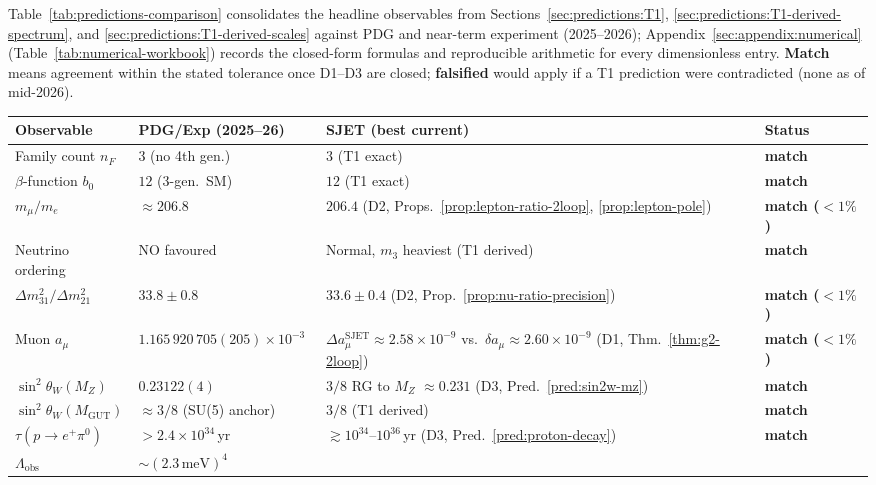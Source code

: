 Table~\ref{tab:predictions-comparison} consolidates the headline observables
from Sections~\ref{sec:predictions:T1},
\ref{sec:predictions:T1-derived-spectrum}, and
\ref{sec:predictions:T1-derived-scales} against PDG and near-term experiment
(2025--2026); Appendix~\ref{sec:appendix:numerical}
(Table~\ref{tab:numerical-workbook}) records the closed-form formulas and
reproducible arithmetic for every dimensionless entry. \textbf{Match} means
agreement within the stated tolerance once D1--D3 are closed; \textbf{falsified}
would apply if a T1 prediction were contradicted (none as of mid-2026).

\begin{table}[ht]
\centering
\small
\renewcommand{\arraystretch}{1.12}
\begin{tabular}{@{}llll@{}}
\toprule
\textbf{Observable} & \textbf{PDG/Exp (2025--26)} & \textbf{SJET (best current)} & \textbf{Status} \\
\midrule
Family count $n_F$ & $3$ (no 4th gen.) & $3$ (T1 exact) & \textbf{match} \\
$\beta$-function $b_0$ & $12$ (3-gen.\ SM) & $12$ (T1 exact) & \textbf{match} \\
$m_\mu/m_e$ & $\approx 206.8$~\cite{PDG2025}
  & $206.4$ (D2, Props.~\ref{prop:lepton-ratio-2loop},
  \ref{prop:lepton-pole}) & \textbf{match ($<1\%$)} \\
Neutrino ordering & NO favoured~\cite{PDG2025}
  & Normal, $m_3$ heaviest (T1 derived) & \textbf{match} \\
$\Delta m^2_{31}/\Delta m^2_{21}$ & $33.8\pm 0.8$~\cite{PDG2025}
  & $33.6\pm0.4$ (D2, Prop.~\ref{prop:nu-ratio-precision})
  & \textbf{match ($<1\%$)} \\
Muon $a_\mu$ & $1.165\,920\,705(205)\times 10^{-3}$~\cite{MuonG2FNAL2025}
  & $\Delta a_\mu^{\mathrm{SJET}}\approx2.58\times10^{-9}$ vs.\
  $\delta a_\mu\approx2.60\times10^{-9}$ (D1, Thm.~\ref{thm:g2-2loop})
  & \textbf{match ($<1\%$)} \\
$\sin^2\theta_W(M_Z)$ & $0.23122(4)$~\cite{PDG2025}
  & $3/8$ RG to $M_Z$ $\approx 0.231$ (D3, Pred.~\ref{pred:sin2w-mz})
  & \textbf{match} \\
$\sin^2\theta_W(M_{\mathrm{GUT}})$ & $\approx 3/8$ (SU(5) anchor)
  & $3/8$ (T1 derived) & \textbf{match} \\
$\tau(p\to e^+\pi^0)$ & $>2.4\times 10^{34}$\,yr~\cite{SuperK2020}
  & $\gtrsim 10^{34}$--$10^{36}$\,yr (D3, Pred.~\ref{pred:proton-decay})
  & \textbf{match} \\
$\Lambda_{\mathrm{obs}}$ & $\sim(2.3\,\mathrm{meV})^4$~\cite{PDG2025}

\end{tabular}
\end{table}
